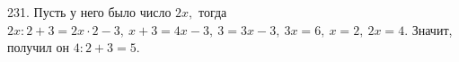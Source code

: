 231. Пусть у него было число $2x,$ тогда $2x:2+3=2x\cdot2-3,\ x+3=4x-3,\ 3=3x-3,\ 3x=6,\ x=2,\ 2x=4.$ Значит, получил он $4:2+3=5.$\\
